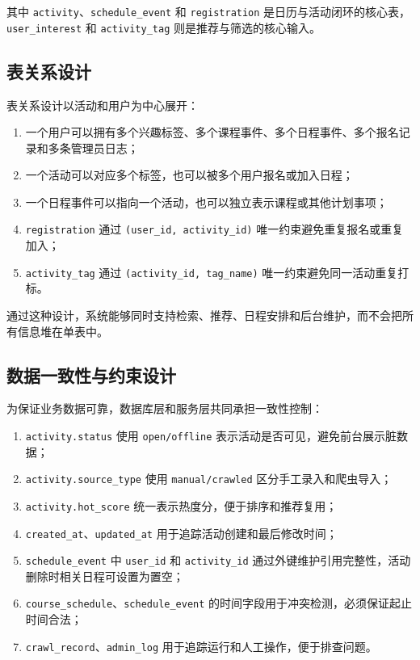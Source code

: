 \documentclass[UTF8,a4paper,12pt,fontset=none]{ctexrep}
\providecommand{\tightlist}{}
\begin{document}
其中 \texttt{activity}、\texttt{schedule\_event} 和 \texttt{registration} 是日历与活动闭环的核心表，\texttt{user\_interest} 和 \texttt{activity\_tag} 则是推荐与筛选的核心输入。

\subsection{表关系设计}\label{ux8868ux5173ux7cfbux8bbeux8ba1}

表关系设计以活动和用户为中心展开：

\begin{enumerate}
\def\labelenumi{\arabic{enumi}.}
\tightlist
\item
  一个用户可以拥有多个兴趣标签、多个课程事件、多个日程事件、多个报名记录和多条管理员日志；
\item
  一个活动可以对应多个标签，也可以被多个用户报名或加入日程；
\item
  一个日程事件可以指向一个活动，也可以独立表示课程或其他计划事项；
\item
  \texttt{registration} 通过 \texttt{(user\_id,\ activity\_id)} 唯一约束避免重复报名或重复加入；
\item
  \texttt{activity\_tag} 通过 \texttt{(activity\_id,\ tag\_name)} 唯一约束避免同一活动重复打标。
\end{enumerate}

通过这种设计，系统能够同时支持检索、推荐、日程安排和后台维护，而不会把所有信息堆在单表中。

\subsection{数据一致性与约束设计}\label{ux6570ux636eux4e00ux81f4ux6027ux4e0eux7ea6ux675fux8bbeux8ba1}

为保证业务数据可靠，数据库层和服务层共同承担一致性控制：

\begin{enumerate}
\def\labelenumi{\arabic{enumi}.}
\tightlist
\item
  \texttt{activity.status} 使用 \texttt{open/offline} 表示活动是否可见，避免前台展示脏数据；
\item
  \texttt{activity.source\_type} 使用 \texttt{manual/crawled} 区分手工录入和爬虫导入；
\item
  \texttt{activity.hot\_score} 统一表示热度分，便于排序和推荐复用；
\item
  \texttt{created\_at}、\texttt{updated\_at} 用于追踪活动创建和最后修改时间；
\item
  \texttt{schedule\_event} 中 \texttt{user\_id} 和 \texttt{activity\_id} 通过外键维护引用完整性，活动删除时相关日程可设置为置空；
\item
  \texttt{course\_schedule}、\texttt{schedule\_event} 的时间字段用于冲突检测，必须保证起止时间合法；
\item
  \texttt{crawl\_record}、\texttt{admin\_log} 用于追踪运行和人工操作，便于排查问题。
\end{enumerate}
\end{document}
